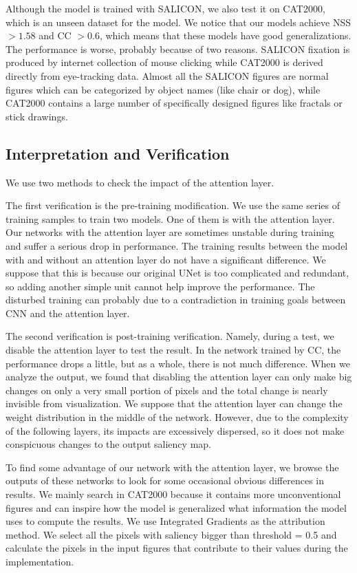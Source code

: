\documentclass[12pt]{article}
\begin{document}
Although the model is trained with SALICON, we also test it on CAT2000, which is an unseen dataset for the model.
We notice that our models achieve NSS $> 1.58$ and CC $> 0.6$, which means that these models have good generalizations.
The performance is worse, probably because of two reasons.
SALICON fixation is produced by internet collection of mouse clicking while CAT2000 is derived directly from eye-tracking data.
Almost all the SALICON figures are normal figures which can be categorized by object names (like chair or dog), while CAT2000 contains a large number of specifically designed figures like fractals or stick drawings.


\subsection{Interpretation and Verification}

We use two methods to check the impact of the attention layer.

The first verification is the pre-training modification. We use the same series of training samples to train two models. One of them is with the attention layer. Our networks with the attention layer are sometimes unstable during training and suffer a serious drop in performance.
The training results between the model with and without an attention layer do not have a significant difference.
We suppose that this is because our original UNet is too complicated and redundant, so adding another simple unit cannot help improve the performance. The disturbed training can probably due to a contradiction in training goals between CNN and the attention layer.

The second verification is post-training verification. Namely, during a test, we disable the attention layer to test the result. In the network trained by CC, the performance drops a little, but as a whole, there is not much difference.
When we analyze the output, we found that disabling the attention layer can only make big changes on only a very small portion of pixels and the total change is nearly invisible from visualization.
We suppose that the attention layer can change the weight distribution in the middle of the network. However, due to the complexity of the following layers, its impacts are excessively dispersed, so it does not make conspicuous changes to the output saliency map.

To find some advantage of our network with the attention layer, we browse the outputs of these networks to look for some occasional obvious differences in results.
We mainly search in CAT2000 because it contains more unconventional figures and can inspire how the model is generalized what information the model uses to compute the results.
We use Integrated Gradients \cite{sundararajan2017axiomatic} as the attribution method. We select all the pixels with saliency bigger than threshold = 0.5 and calculate the pixels in the input figures that contribute to their values during the implementation.
\end{document}
